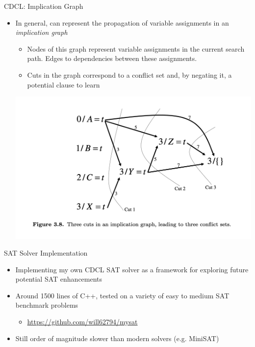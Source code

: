 \documentclass{beamer}
\begin{document}
\begin{frame}{CDCL: Implication Graph}
    \begin{itemize}
        \item In general, can represent the propagation of variable assignments in an \textit{implication graph} \cite{09bieresathandbook}
        \pause
        \begin{itemize}
            \item Nodes of this graph represent variable assignments in the current search path. Edges to dependencies between these assignments.
            \item Cuts in the graph correspond to a conflict set and, by negating it, a potential clause to learn
        \end{itemize}
        \begin{center}
            \includegraphics[scale=0.3]{figures/implication-graph.png}
        \end{center}
\end{itemize}
\end{frame}


\begin{frame}{SAT Solver Implementation}
    \begin{itemize}[<+->]
        \item Implementing my own CDCL SAT solver as a framework for exploring future potential SAT enhancements
        \item Around 1500 lines of C++, tested on a variety of easy to medium SAT benchmark problems
        \begin{itemize}
            \item \url{https://github.com/will62794/mysat} 
        \end{itemize}
        \item Still order of magnitude slower than modern solvers (e.g. MiniSAT)
    \end{itemize}
\end{frame}
\end{document}

